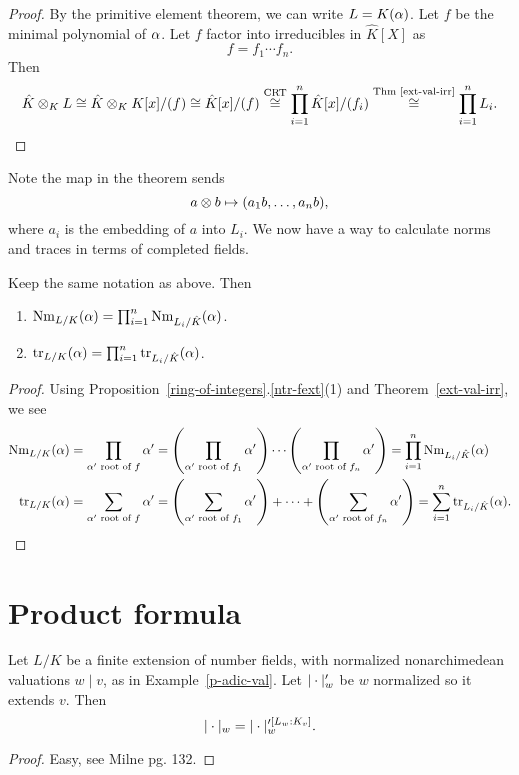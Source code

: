 \begin{proof}
By the primitive element theorem, %
we can write $L=K(\alpha)$. Let $f$ be the minimal polynomial of $\alpha$. Let $f$ factor into irreducibles in $\hat K[X]$ as
\[
f=f_1\cdots f_n.
\]
Then
\[
\hat K\otimes_K L\cong \hat K\otimes_K K[x]/(f)\cong \hat K[x]/(f)\stackrel{\text{CRT}}{\cong} \prod_{i=1}^n \hat K[x]/(f_i)
\stackrel{\text{Thm~\ref{ext-val-irr}}}{\cong} \prod_{i=1}^n L_i.\qedhere
\]
\end{proof}
Note the map in the theorem sends 
\[
a\otimes b\mapsto (a_1b,\ldots, a_nb),
\]
where $a_i$ is the embedding of $a$ into $L_i$.
We now have a way to calculate norms and traces in terms of completed fields.
\begin{cor}
Keep the same notation as above. Then
\begin{enumerate}
\item $\operatorname{Nm}_{L/K}(\alpha)=\prod_{i=1}^n \operatorname{Nm}_{L_i/\hat K}(\alpha)$.
\item $\operatorname{tr}_{L/K}(\alpha)=\prod_{i=1}^n \operatorname{tr}_{L_i/\hat K}(\alpha)$.
\end{enumerate}
\end{cor}
\begin{proof}
Using Proposition~\ref{ring-of-integers}.\ref{ntr-fext}(1) and Theorem~\ref{ext-val-irr}, we see
\begin{align*}
\operatorname{Nm}_{L/K}(\alpha)&=\prod_{\alpha'\text{ root of }f}\alpha'=\left( {\prod_{\alpha'\text{ root of }f_1}\alpha'} \right)\cdots \left( {\prod_{\alpha'\text{ root of }f_n}\alpha'} \right)
=\prod_{i=1}^n \operatorname{Nm}_{L_i/\hat K}(\alpha)\\
\operatorname{tr}_{L/K}(\alpha)&=\sum_{\alpha'\text{ root of }f}\alpha'=\left( {\sum_{\alpha'\text{ root of }f_1}\alpha'} \right)+\cdots+ \left( {\sum_{\alpha'\text{ root of }f_n}\alpha'} \right)
=\sum_{i=1}^n \operatorname{tr}_{L_i/\hat K}(\alpha).
\end{align*}
\end{proof}

\section{Product formula}
\begin{lem}
Let $L/K$ be a finite extension of number fields, with normalized nonarchimedean valuations $w\mid v$, as in Example~\ref{p-adic-val}. Let $|\cdot|_w'$ be $w$ normalized so it extends $v$. Then
\[
|\cdot|_w = |\cdot|_w'^{[L_w:K_v]}.
\]
\end{lem}
\begin{proof}
Easy, see Milne pg. 132.
\end{proof}

